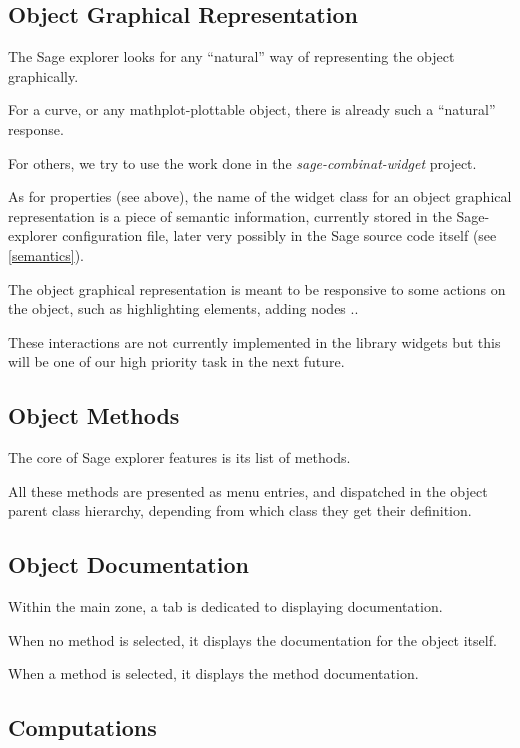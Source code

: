 \documentclass{deliverablereport}
\begin{document}
\subsection{Object Graphical Representation}
\label{representation}

The Sage explorer looks for any ``natural'' way of representing the
object graphically.

For a curve, or any mathplot-plottable object, there is already such a
``natural'' response.

For others, we try to use the work done in the
\emph{sage-combinat-widget} project.

As for properties (see above), the name of the widget class for an
object graphical representation is a piece of semantic information,
currently stored in the Sage-explorer configuration file, later very
possibly in the Sage source code itself (see \ref{semantics}).

The object graphical representation is meant to be responsive to some
actions on the object, such as highlighting elements, adding nodes ..

These interactions are not currently implemented in the library widgets but
this will be one of our high priority task in the next future.

\subsection{Object Methods}

The core of Sage explorer features is its list of methods.

All these methods are presented as menu entries, and dispatched in the
object parent class hierarchy, depending from
which class they get their definition.

\subsection{Object Documentation}

Within the main zone, a tab is dedicated to displaying documentation.

When no method is selected, it displays the documentation for the object itself.

When a method is selected, it displays the method documentation.

\subsection{Computations}
\end{document}
